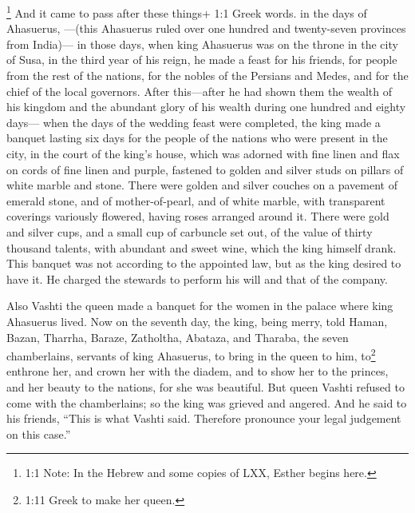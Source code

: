 \footnote{1:1 Note: In the Hebrew and some copies of LXX, Esther begins
  here.} And it came to pass after these things+ 1:1 Greek words. in the
days of Ahasuerus, ---(this Ahasuerus ruled over one hundred and
twenty-seven provinces from India)---  in those days, when
king Ahasuerus was on the throne in the city of Susa,  in
the third year of his reign, he made a feast for his friends, for people
from the rest of the nations, for the nobles of the Persians and Medes,
and for the chief of the local governors.  After
this---after he had shown them the wealth of his kingdom and the
abundant glory of his wealth during one hundred and eighty days---
 when the days of the wedding feast were completed, the king
made a banquet lasting six days for the people of the nations who were
present in the city, in the court of the king's house, 
which was adorned with fine linen and flax on cords of fine linen and
purple, fastened to golden and silver studs on pillars of white marble
and stone. There were golden and silver couches on a pavement of emerald
stone, and of mother-of-pearl, and of white marble, with transparent
coverings variously flowered, having roses arranged around it.
 There were gold and silver cups, and a small cup of
carbuncle set out, of the value of thirty thousand talents, with
abundant and sweet wine, which the king himself drank.  This
banquet was not according to the appointed law, but as the king desired
to have it. He charged the stewards to perform his will and that of the
company.

 Also Vashti the queen made a banquet for the women in the
palace where king Ahasuerus lived.  Now on the seventh day,
the king, being merry, told Haman, Bazan, Tharrha, Baraze, Zatholtha,
Abataza, and Tharaba, the seven chamberlains, servants of king
Ahasuerus,  to bring in the queen to him, to\footnote{1:11
  Greek to make her queen.} enthrone her, and crown her with the diadem,
and to show her to the princes, and her beauty to the nations, for she
was beautiful.  But queen Vashti refused to come with the
chamberlains; so the king was grieved and angered.  And he
said to his friends, ``This is what Vashti said. Therefore pronounce
your legal judgement on this case.''

